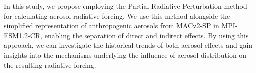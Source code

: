 \documentclass[draft]{agujournal2019}
\begin{document}
      In this study, we propose employing the Partial Radiative Perturbation method \cite{Wetherald_1988,Colman_1997,Klocke_2013} for calculating aerosol radiative forcing. We use this method alongside the simplified representation of anthropogenic aerosols from MACv2-SP in MPI-ESM1.2-CR, enabling the separation of direct and indirect effects. By using this approach, we can investigate the historical trends of both aerosol effects and gain insights into the mechanisms underlying the influence of aerosol distribution on the resulting radiative forcing.
                  
 
\end{document}

